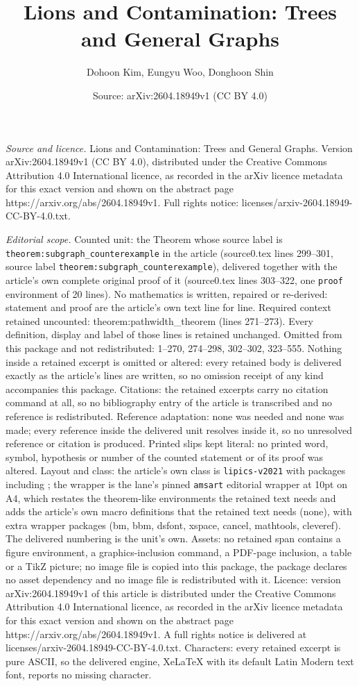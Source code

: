 \documentclass[10pt,a4paper]{amsart}
\title[Lions and Contamination: Trees and General Graphs]{Lions and Contamination: Trees and General Graphs}
\author{Dohoon Kim, Eungyu Woo, Donghoon Shin}
\date{Source: arXiv:2604.18949v1 (CC BY 4.0)}
\begin{document}
\maketitle

\noindent\emph{Source and licence.} Lions and Contamination: Trees and General Graphs. Version arXiv:2604.18949v1 (CC BY 4.0), distributed under the Creative Commons Attribution 4.0 International licence, as recorded in the arXiv licence metadata for this exact version and shown on the abstract page https://arxiv.org/abs/2604.18949v1. Full rights notice: licenses/arxiv-2604.18949-CC-BY-4.0.txt.\par\smallskip

\noindent\textit{Editorial scope.} Counted unit: the Theorem whose source label is \texttt{theorem:subgraph\_counterexample} in the article (source0.tex lines 299--301, source label \texttt{theorem:subgraph\_counterexample}), delivered together with the article's own complete original proof of it (source0.tex lines 303--322, one \texttt{proof} environment of 20 lines). No mathematics is written, repaired or re-derived: statement and proof are the article's own text line for line. Required context retained uncounted: theorem:pathwidth\_theorem (lines 271--273). Every definition, display and label of those lines is retained unchanged. Omitted from this package and not redistributed: 1--270, 274--298, 302--302, 323--555. Nothing inside a retained excerpt is omitted or altered: every retained body is delivered exactly as the article's lines are written, so no omission receipt of any kind accompanies this package. Citations: the retained excerpts carry no citation command at all, so no bibliography entry of the article is transcribed and no reference is redistributed. Reference adaptation: none was needed and none was made; every reference inside the delivered unit resolves inside it, so no unresolved reference or citation is produced. Printed slips kept literal: no printed word, symbol, hypothesis or number of the counted statement or of its proof was altered. Layout and class: the article's own class is \texttt{lipics-v2021} with packages including ; the wrapper is the lane's pinned \texttt{amsart} editorial wrapper at 10pt on A4, which restates the theorem-like environments the retained text needs and adds the article's own macro definitions that the retained text needs (none), with extra wrapper packages (bm, bbm, dsfont, xspace, cancel, mathtools, cleveref). The delivered numbering is the unit's own. Assets: no retained span contains a figure environment, a graphics-inclusion command, a PDF-page inclusion, a table or a TikZ picture; no image file is copied into this package, the package declares no asset dependency and no image file is redistributed with it. Licence: version arXiv:2604.18949v1 of this article is distributed under the Creative Commons Attribution 4.0 International licence, as recorded in the arXiv licence metadata for this exact version and shown on the abstract page https://arxiv.org/abs/2604.18949v1. A full rights notice is delivered at licenses/arxiv-2604.18949-CC-BY-4.0.txt. Characters: every retained excerpt is pure ASCII, so the delivered engine, XeLaTeX with its default Latin Modern text font, reports no missing character.
\end{document}
